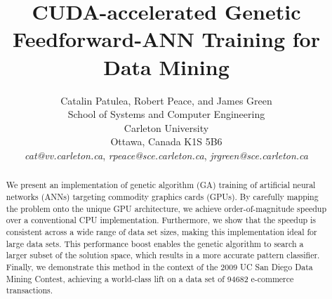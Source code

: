 \documentclass[11pt]{article}       %
\begin{document}


\title{CUDA-accelerated Genetic Feedforward-ANN Training for Data Mining}


\author{
Catalin Patulea, Robert Peace, and James Green\\
School of Systems and Computer Engineering\\
Carleton University\\
Ottawa, Canada K1S 5B6\\
{\em cat@vv.carleton.ca}, {\em rpeace@sce.carleton.ca}, {\em jrgreen@sce.carleton.ca}
} %

\maketitle

\begin{abstract}
We present an implementation of genetic algorithm (GA) training of artificial neural networks (ANNs) targeting commodity graphics cards (GPUs). By carefully mapping the problem onto the unique GPU architecture, we achieve order-of-magnitude speedup over a conventional CPU implementation. Furthermore, we show that the speedup is consistent across a wide range of data set sizes, making this implementation ideal for large data sets. This performance boost enables the genetic algorithm to search a larger subset of the solution space, which results in a more accurate pattern classifier. Finally, we demonstrate this method in the context of the 2009 UC San Diego Data Mining Contest, achieving a world-class lift on a data set of 94682 e-commerce transactions.
\end{abstract}

\end{document}
